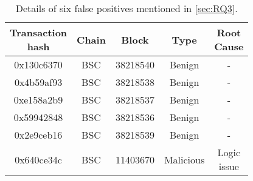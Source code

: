 
\begin{table}[t]
    \centering
    \small
    \caption{Details of six false positives mentioned in \mysec\ref{sec:RQ3}.}
    \begin{tabular}{c|c|c|c|c}
    \toprule
        \makecell[c]{Transaction\\hash} & Chain & Block & Type & \makecell[c]{Root\\Cause} \\
        \midrule
        0x130c6370 & BSC & 38218540 & Benign & -\\
        0x4b59af93 & BSC & 38218538 & Benign & -\\
        0xe158a2b9 & BSC & 38218537 & Benign & -\\
        0x59942848 & BSC & 38218536 & Benign & -\\
        0x2e9ceb16 & BSC & 38218539 & Benign & -\\
        0x640ce34c & BSC & 11403670 & Malicious & \makecell[c]{Logic\\issue}\\
        \bottomrule
    \end{tabular}
    \label{tab:false_positives}
\end{table}

